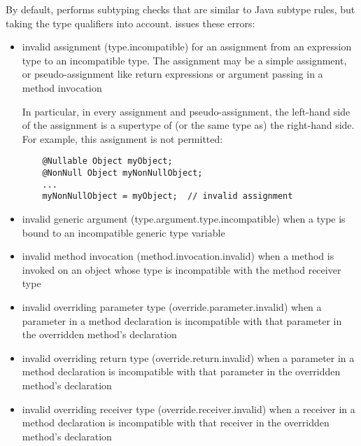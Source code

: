 By default,  performs subtyping checks that are
similar to Java subtype rules, but taking the type qualifiers into account.
 issues these errors:

\begin{itemize}

\item invalid assignment (type.incompatible) for an assignment from
  an expression type to an incompatible type.  The assignment may be a
  simple assignment, or pseudo-assignment like return expressions or
  argument passing in a method invocation

  In particular, in every assignment and pseudo-assignment, the
  left-hand side of the assignment is a supertype of (or the same type
  as) the right-hand side.  For example, this assignment is not
  permitted:

  \begin{Verbatim}
    @Nullable Object myObject;
    @NonNull Object myNonNullObject;
    ...
    myNonNullObject = myObject;  // invalid assignment
  \end{Verbatim}

\item invalid generic argument (type.argument.type.incompatible) when a type
  is bound to an incompatible generic type variable

\item invalid method invocation (method.invocation.invalid) when a
  method is invoked on an object whose type is incompatible with the
  method receiver type

\item invalid overriding parameter type (override.parameter.invalid)
  when a parameter in a method declaration is incompatible with that
  parameter in the overridden method's declaration

\item invalid overriding return type (override.return.invalid) when a
  parameter in a method declaration is incompatible with that
  parameter in the overridden method's declaration

\item invalid overriding receiver type (override.receiver.invalid)
  when a receiver in a method declaration is incompatible with that
  receiver in the overridden method's declaration

\end{itemize}



